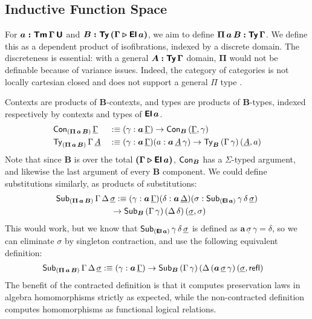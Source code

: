 \documentclass[sigplan,review,anonymous]{acmart}\settopmatter{printfolios=true,printccs=false,printacmref=false}
\newcommand{\ext}{\triangleright}
\newcommand{\bTy}{\boldsymbol{\Ty}}
\newcommand{\bGamma}{\boldsymbol{\Gamma}}
\newcommand{\bA}{\boldsymbol{A}}
\newcommand{\ba}{\boldsymbol{a}}
\newcommand{\bB}{\boldsymbol{B}}
\newcommand{\bEl}{\boldsymbol{\El}}
\newcommand{\bPii}{\boldsymbol{\Pi}}
\newcommand{\ul}[1]{\underline{#1}}
\newcommand{\ulGamma}{\ul{\Gamma}}
\newcommand{\ulDelta}{\ul{\Delta}}
\newcommand{\ulsigma}{\ul{\sigma}}
\newcommand{\ulA}{\ul{A}}
\begin{document}
\subsection{Inductive Function Space}

For $\boldsymbol{a : \mathsf{Tm}\,\Gamma\,\mathsf{U}}$ and $\boldsymbol{B :
  \Ty\,(\Gamma\ext\El\,a)}$, we aim to define $\boldsymbol{\Pi\,a\,B}
\boldsymbol{:} \bTy\,\bGamma$. We define this as a dependent product of
isofibrations, indexed by a discrete domain. The discreteness is essential: with
a general $\bA \boldsymbol{:} \bTy\,\bGamma$ domain, $\bPii$ would not be
definable because of variance issues. Indeed, the category of categories is not
locally cartesian closed and does not support a general $\Pi$ type
\cite{johnstone2002sketches}.

Contexts are products of $\bB$-contexts, and types are products of $\bB$-types,
indexed respectively by contexts and types of $\bEl\,\ba$.
\begin{alignat*}{3}
  & \Con_{(\bPii\,\ba\,\bB)}\,\ulGamma &&:\equiv (\gamma : \ba\,\ulGamma)\ra \Con_{\bB}\,(\ulGamma, \gamma)\\
  & \Ty_{(\bPii\,\ba\,\bB)}\,\Gamma\,\ulA &&:\equiv (\gamma : \ba\,\ulGamma)(a : \ba\,\ulA\,\gamma)\ra \Ty_{\bB}\,(\Gamma\,\gamma)\,(\ulA, a)
\end{alignat*}
Note that since $\bB$ is over the total $\boldsymbol{(\Gamma\ext\El\,a)}$,
$\Con_{\bB}$ has a $\Sigma$-typed argument, and likewise the last argument
of every $\bB$ component.  We could define substitutions similarly, as
products of substitutions:
\begin{alignat*}{3}
  & \Sub_{(\bPii\,\ba\,\bB)}\,\Gamma\,\Delta\,\ulsigma :\equiv
  (\gamma : \ba\,\ulGamma)(\delta : \ba\,\ulDelta)
  (\sigma : \Sub_{(\bEl\,\ba)}\,\gamma\,\delta\,\ulsigma)\\
  &\hspace{6.5em}\ra \Sub_{\bB}\,(\Gamma\,\gamma)\,(\Delta\,\delta)\,(\ulsigma, \sigma)
\end{alignat*}
This would work, but we know that $\Sub_{(\bEl\,\ba)}\,\gamma\,\delta\,\ulsigma$ is defined
as $\ba\,\ulsigma\,\gamma = \delta$, so we can eliminate $\sigma$ by singleton contraction,
and use the following equivalent definition:
\begin{alignat*}{3}
  & \Sub_{(\bPii\,\ba\,\bB)}\,\Gamma\,\Delta\,\ulsigma :\equiv
  (\gamma : \ba\,\ulGamma)\ra\Sub_{\bB}\,(\Gamma\,\gamma)\,(\Delta\,(\ba\,\ulsigma\,\gamma)\,(\ulsigma, \refl)
\end{alignat*}
The benefit of the contracted definition is that it computes preservation laws
in algebra homomorphisms strictly as expected, while the non-contracted
definition computes homomorphisms as functional logical relations.
\end{document}
